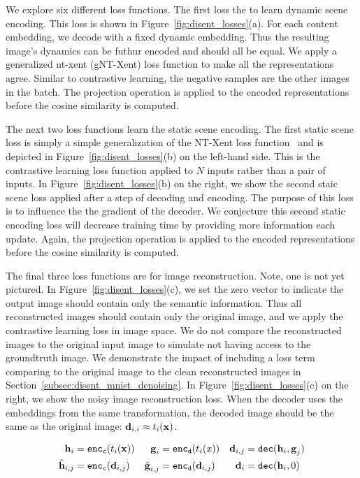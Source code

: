 \documentclass[11pt]{article}
\begin{document}
We explore six different loss functions. The first loss the to learn dynamic scene encoding. This loss is shown in Figure~\ref{fig:disent_losses}(a). For each content embedding, we decode with a fixed dynamic embedding. Thus the resulting image's dynamics can be futhur encoded and should all be equal. We apply a generalized nt-xent (gNT-Xent) loss function to make all the representations agree. Similar to contrastive learning, the negative samples are the other images in the batch. The projection operation is applied to the encoded representations before the cosine similarity is computed.

The next two loss functions learn the static scene encoding. The first static scene loss is simply a simple generalization of the NT-Xent loss function~\cite{chen2020simple} and is depicted in Figure~\ref{fig:disent_losses}(b) on the left-hand side. This is the contrastive learning loss function applied to $N$ inputs rather than a pair of inputs. In Figure~\ref{fig:disent_losses}(b) on the right, we show the second staic scene loss applied after a step of decoding and encoding. The purpose of this loss is to influence the the gradient of the decoder. We conjecture this second static encoding loss will decrease training time by providing more information each update. Again, the projection operation is applied to the encoded representations before the cosine similarity is computed.
 
The final three loss functions are for image reconstruction. Note, one is not yet pictured. In Figure~\ref{fig:disent_losses}(c), we set the zero vector to indicate the output image should contain only the semantic information. Thus all reconstructed images should contain only the original image, and we apply the contrastive learning loss in image space. We do not compare the reconstructed images to the original input image to simulate not having access to the groundtruth image. We demonstrate the impact of including a loss term comparing to the original image to the clean reconstructed images in Section~\ref{subsec:disent_mnist_denoising}. In Figure~\ref{fig:disent_losses}(c) on the right, we show the noisy image reconstruction loss. When the decoder uses the embeddings from the same transformation, the decoded image should be the same as the original image: $\boldsymbol{\mathrm{d}}_{i,i} \approx t_i(\boldsymbol{\mathrm{x}})$. 


\begin{align}\label{eq:repr}
  \boldsymbol{\mathrm{h}}_i &= {\tt enc_c}(t_i(\boldsymbol{\mathrm{x}})) &  \boldsymbol{\mathrm{g}}_i &= {\tt enc_d}(t_i(x)) &  \boldsymbol{\mathrm{d}}_{i,j} &= {\tt dec}(\boldsymbol{\mathrm{h}}_i,\boldsymbol{\mathrm{g}}_j)
  \\\nonumber
  \hat{\boldsymbol{\mathrm{h}}}_{i,j} &= {\tt enc_c}(\boldsymbol{\mathrm{d}}_{i,j}) & \hat{\boldsymbol{\mathrm{g}}}_{i,j} &= {\tt enc_d}(\boldsymbol{\mathrm{d}}_{i,j}) & \boldsymbol{\mathrm{d}}_i &= {\tt dec}(\boldsymbol{\mathrm{h}}_i,0)
\end{align}
\end{document}
